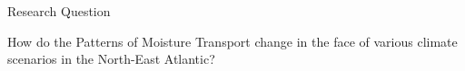 \begin{frame}{Research Question}
  \begin{center}
    {\huge
      How do the Patterns of Moisture Transport change in the face of various climate scenarios in the North-East Atlantic?
    }
    
  \end{center}  

\end{frame}
